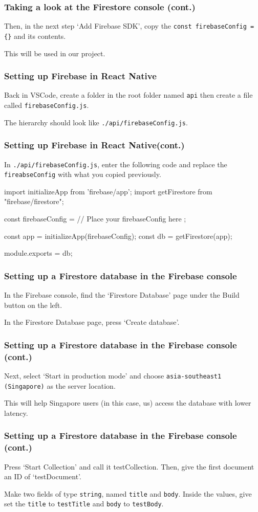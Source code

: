 \documentclass{beamer}
\begin{document}
  \begin{frame}[fragile]
    \frametitle{Taking a look at the Firestore console (cont.)}
    Then, in the next step `Add Firebase SDK', copy the \verb|const firebaseConfig = {}| and its contents. 

    This will be used in our project. 
  \end{frame}

  \begin{frame}[fragile]
    \frametitle{Setting up Firebase in React Native}
    Back in VSCode, create a folder in the root folder named \verb|api| then create a file called \verb|firebaseConfig.js|. 

    The hierarchy should look like \verb|./api/firebaseConfig.js|.
  \end{frame}
  \begin{frame}[fragile]
    \frametitle{Setting up Firebase in React Native(cont.)}
    In \verb|./api/firebaseConfig.js|, enter the following code and replace the \verb|fireabseConfig| with what you copied previously.

    \begin{jscodesmall}
import { initializeApp } from 'firebase/app';
import {getFirestore} from "firebase/firestore";

const firebaseConfig = {
  // Place your firebaseConfig here
};

const app = initializeApp(firebaseConfig);
const db = getFirestore(app);

module.exports = db;
    \end{jscodesmall}
  \end{frame}

  \begin{frame}[fragile]
    \frametitle{Setting up a Firestore database in the Firebase console}
    In the Firebase console, find the `Firestore Database' page under the Build button on the left. 

    In the Firestore Database page, press `Create database'.
  \end{frame}
  \begin{frame}[fragile]
    \frametitle{Setting up a Firestore database in the Firebase console (cont.)}
    Next, select `Start in production mode' and choose \verb|asia-southeast1 (Singapore)| as the server location. 

    This will help Singapore users (in this case, us) access the database with lower latency.
  \end{frame}
  \begin{frame}[fragile]
    \frametitle{Setting up a Firestore database in the Firebase console (cont.)}
    Press `Start Collection' and call it testCollection. 
    Then, give the first document an ID of `testDocument'.

    Make two fields of type \verb|string|, named \verb|title| and \verb|body|. 
    Inside the values, give set the \verb|title| to \verb|testTitle| and \verb|body| to \verb|testBody|. 
  \end{frame}
\end{document}
